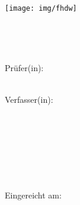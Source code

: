 
\begin{titlepage}

\begin{center}
\texttt{[image: img/fhdw]}

\vspace{7mm}

\Huge{\bfseries\dokumententyp}\\

\vspace{5mm}

\LARGE{\dokumententitel}\\

\vspace{15mm}

\large{Prüfer(in):\\

\dokumentenpruefer\\

\vspace{15mm}

Verfasser(in):\\

\dokumentenautor\\

\martikelnummer\\

\vspace{3mm}

\dokumentenautoradress\\

\vspace{7mm}

\studiengang\\

\spezialisierungsbereich\\

}

\enlargethispage{2em}

\vspace{15mm}

\large{Eingereicht am:\\

\abgabedatum \\

}

\end{center}


\end{titlepage}

